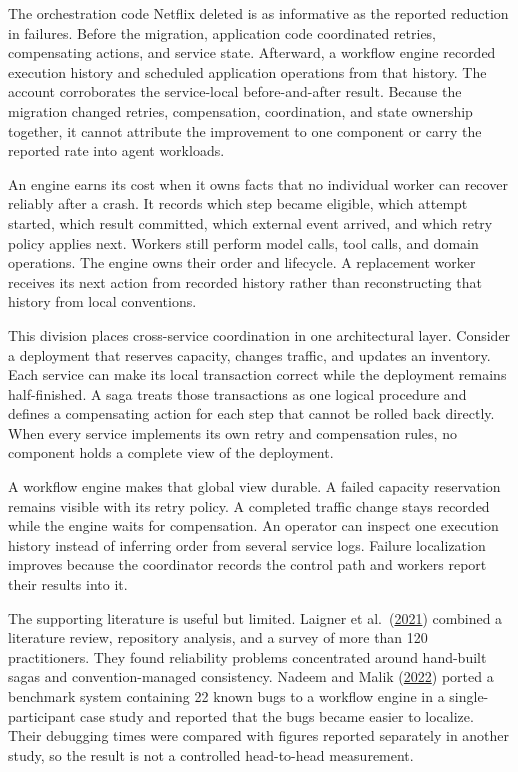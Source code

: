 The orchestration code Netflix deleted is as informative as the reported reduction in failures. Before the migration, application code coordinated retries, compensating actions, and service state. Afterward, a workflow engine recorded execution history and scheduled application operations from that history. The account corroborates the service-local before-and-after result. Because the migration changed retries, compensation, coordination, and state ownership together, it cannot attribute the improvement to one component or carry the reported rate into agent workloads.

An engine earns its cost when it owns facts that no individual worker can recover reliably after a crash. It records which step became eligible, which attempt started, which result committed, which external event arrived, and which retry policy applies next. Workers still perform model calls, tool calls, and domain operations. The engine owns their order and lifecycle. A replacement worker receives its next action from recorded history rather than reconstructing that history from local conventions.

This division places cross-service coordination in one architectural layer. Consider a deployment that reserves capacity, changes traffic, and updates an inventory. Each service can make its local transaction correct while the deployment remains half-finished. A saga treats those transactions as one logical procedure and defines a compensating action for each step that cannot be rolled back directly. When every service implements its own retry and compensation rules, no component holds a complete view of the deployment.

A workflow engine makes that global view durable. A failed capacity reservation remains visible with its retry policy. A completed traffic change stays recorded while the engine waits for compensation. An operator can inspect one execution history instead of inferring order from several service logs. Failure localization improves because the coordinator records the control path and workers report their results into it.

The supporting literature is useful but limited. Laigner et al.~(\href{https://arxiv.org/abs/2103.00170}{2021}) combined a literature review, repository analysis, and a survey of more than 120 practitioners. They found reliability problems concentrated around hand-built sagas and convention-managed consistency. Nadeem and Malik (\href{https://arxiv.org/abs/2204.07210}{2022}) ported a benchmark system containing 22 known bugs to a workflow engine in a single-participant case study and reported that the bugs became easier to localize. Their debugging times were compared with figures reported separately in another study, so the result is not a controlled head-to-head measurement.

